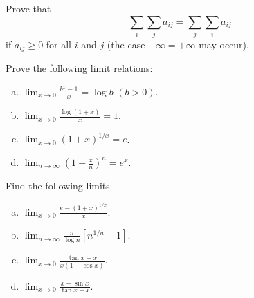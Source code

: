 \begin{myExercise}
    \label{ex:8.3}
    Prove that 
    \begin{equation*}
        \sum_i \sum_j a_{ij} = 
        \sum_j \sum_i a_{ij} 
    \end{equation*}
    if $a_{ij} \geq 0$ for all $i$ and $j$ (the case $+\infty=+\infty$ may occur).
\end{myExercise}


\begin{myExercise}
    \label{ex:8.4}
    Prove the following limit relations:
    \begin{enumerate}[(a)]
        \item $\lim_{x \to 0} \frac{b^x-1}{x}=\log b$  $(b>0)$.
        \item $\lim_{x \to 0} \frac{\log(1+x)}{x}=1$.
        \item $\lim_{x \to 0} (1+x)^{1/x}=e$.
        \item $\lim_{n \to \infty} \left( 1+\frac{x}{n} \right)^n=e^x$.
    \end{enumerate}
\end{myExercise}


\begin{myExercise}
    \label{ex:8.5}
    Find the following limits 
    \begin{enumerate}[(a)]
        \item $\lim_{x \to 0} \frac{e-(1+x)^{1/x}}{x}$.
        \item $\lim_{n \to \infty} \frac{n}{\log n}\left[ n^{1/n}-1 \right]$.
        \item $\lim_{x \to 0} \frac{\tan x-x}{x(1-\cos x)}$.
        \item $\lim_{x \to 0} \frac{x-\sin x}{\tan x-x}$.
    \end{enumerate}
\end{myExercise}